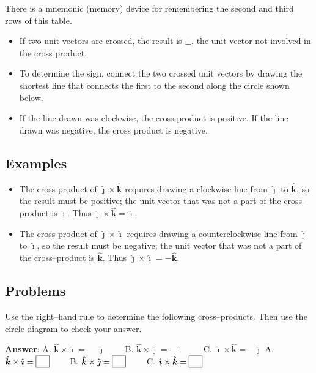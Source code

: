 \documentclass{article}
\newcommand{\ihat}[0]{\hat{\boldsymbol{\imath}}}
\newcommand{\jhat}[0]{\hat{\boldsymbol{\jmath}}}
\newcommand{\khat}[0]{\hat{\boldsymbol{k}}}
\begin{document}
There is a mnemonic (memory) device for remembering the second and third rows of this table.

\begin{itemize}

  \item If two unit vectors are crossed, the result is $\pm$, the unit vector not involved in the cross product.

  \item To determine the sign, connect the two crossed unit vectors by drawing the shortest line that connects the first to the second along the circle shown below.

  \item If the line drawn was clockwise, the cross product is positive. If the line drawn was negative, the cross product is negative.

\end{itemize}



\subsection{Examples}

\begin{itemize}

  \item The cross product of $\jhat \times \khat$ requires drawing a clockwise line from $\jhat$ to $\khat$, so the result must be positive; the unit vector that was not a part of the cross--product is $\ihat$. Thus $\jhat \times \khat = \ihat$.

  \item The cross product of $\jhat \times \ihat$ requires drawing a counterclockwise line from $\jhat$ to $\ihat$, so the result must be negative; the unit vector that was not a part of the cross--product is $\khat$. Thus $\jhat \times \ihat = -\khat$.

\end{itemize}

\subsection{Problems}

Use the right--hand rule to determine the following cross--products. Then use the circle diagram to check your answer.

\ifsolutions
\textbf{Answer}:
A. $\khat \times \ihat = \boxed{\phantom{-}\jhat}\qquad$
B. $\khat \times \jhat = \boxed{-\ihat}\qquad$
C. $\ihat \times \khat = \boxed{-\jhat}$
\else
A. $\khat \times \ihat = \fbox{\phantom M}\qquad$
B. $\khat \times \jhat = \fbox{\phantom M}\qquad$
C. $\ihat \times \khat = \fbox{\phantom M}$
\fi
\end{document}
